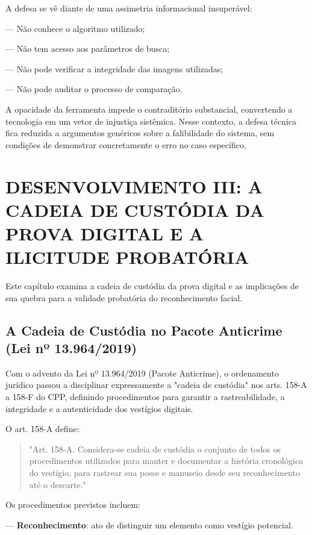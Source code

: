 \documentclass[12pt,a4paper]{article}
\begin{document}
A defesa se vê diante de uma assimetria informacional insuperável:

--- Não conhece o algoritmo utilizado;

--- Não tem acesso aos parâmetros de busca;

--- Não pode verificar a integridade das imagens utilizadas;

--- Não pode auditar o processo de comparação.

A opacidade da ferramenta impede o contraditório substancial, convertendo a tecnologia em um vetor de injustiça sistêmica. Nesse contexto, a defesa técnica fica reduzida a argumentos genéricos sobre a falibilidade do sistema, sem condições de demonstrar concretamente o erro no caso específico.

\section{DESENVOLVIMENTO III: A CADEIA DE CUSTÓDIA DA PROVA DIGITAL E A ILICITUDE PROBATÓRIA}

Este capítulo examina a cadeia de custódia da prova digital e as implicações de sua quebra para a validade probatória do reconhecimento facial.

\subsection{A Cadeia de Custódia no Pacote Anticrime (Lei nº 13.964/2019)}

Com o advento da Lei nº 13.964/2019 (Pacote Anticrime), o ordenamento jurídico passou a disciplinar expressamente a "cadeia de custódia" nos arts. 158-A a 158-F do CPP, definindo procedimentos para garantir a rastreabilidade, a integridade e a autenticidade dos vestígios digitais.

O art. 158-A define:

\begin{quote}
"Art. 158-A. Considera-se cadeia de custódia o conjunto de todos os procedimentos utilizados para manter e documentar a história cronológica do vestígio, para rastrear sua posse e manuseio desde seu reconhecimento até o descarte."
\end{quote}

Os procedimentos previstos incluem:

--- \textbf{Reconhecimento}: ato de distinguir um elemento como vestígio potencial.
\end{document}
